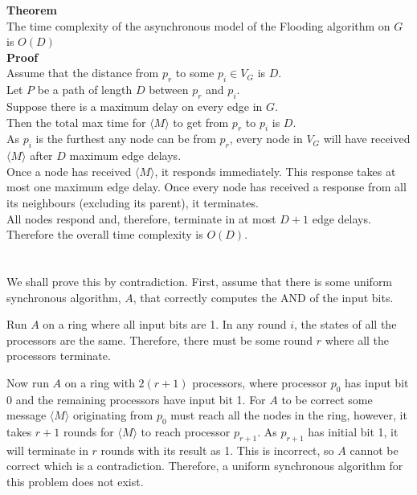 \documentclass[11pt]{article}
\begin{document}
\textbf{Theorem}\\
The time complexity of the asynchronous model of the Flooding algorithm on $G$ is $O(D)$\\

\textbf{Proof}\\
Assume that the distance from $p_r$ to some $p_i \in V_G$ is $D$.\\
Let $P$ be a path of length $D$ between $p_r$ and $p_i$.\\
Suppose there is a maximum delay on every edge in $G$.\\
Then the total max time for $\langle M \rangle$ to get from $p_r$ to $p_i$ is $D$.\\
As $p_i$ is the furthest any node can be from $p_r$, every node in $V_G$ will have received $\langle M \rangle$ after $D$ maximum edge delays. \\
Once a node has received $\langle M \rangle$, it responds immediately. This response takes at most one maximum edge delay. Once every node has received a response from all its neighbours (excluding its parent), it terminates.\\
All nodes respond and, therefore, terminate in at most $D+1$ edge delays.\\
Therefore the overall time complexity is $O(D)$.

\newpage

\section{}

\subsection{}

We shall prove this by contradiction.
First, assume that there is some uniform synchronous algorithm, $A$, that correctly computes the AND of the input bits. 

Run $A$ on a ring where all input bits are 1. In any round $i$, the states of all the processors are the same. Therefore, there must be some round $r$ where all the processors terminate.

Now run $A$ on a ring with $2(r+1)$ processors, where processor $p_0$ has input bit 0 and the remaining processors have input bit 1. For $A$ to be correct some message $\langle M \rangle$ originating from $p_0$ must reach all the nodes in the ring, however, it takes $r+1$ rounds for $\langle M \rangle$ to reach processor $p_{r+1}$. As $p_{r+1}$ has initial bit 1, it will terminate in $r$ rounds with its result as 1. This is incorrect, so $A$ cannot be correct which is a contradiction. Therefore, a uniform synchronous algorithm for this problem does not exist. 
\end{document}
